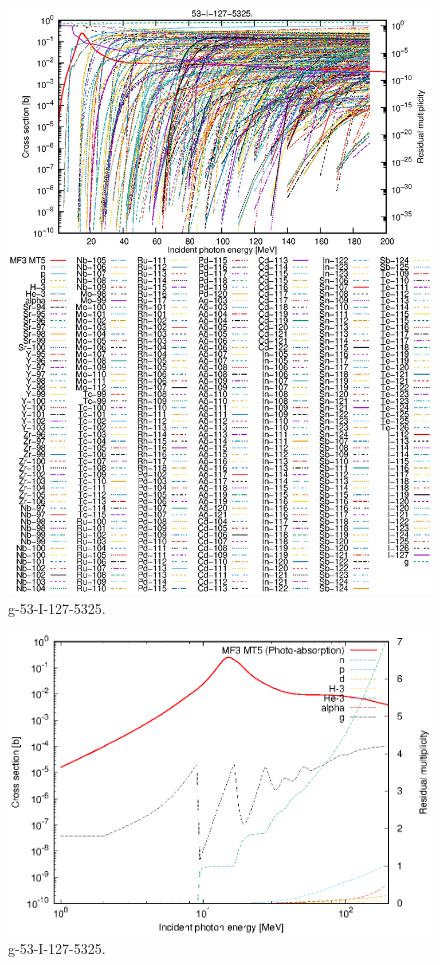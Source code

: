 \begin{figure}
 \includegraphics[width=\linewidth]{eps/g_53-I-127_5325.eps}
  \caption{g-53-I-127-5325.}
\end{figure}
\newpage \clearpage

\begin{figure}
 \includegraphics[width=\linewidth]{eps-log/g_53-I-127_5325.eps}
 \caption{g-53-I-127-5325.}
\end{figure}
\newpage \clearpage

